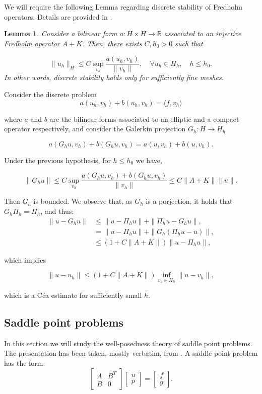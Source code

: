 \documentclass{article}
\newcommand{\R}{\mathbb{R}}
\newtheorem{lemma}{Lemma}
\begin{document}
We will require the following Lemma regarding discrete stability of Fredholm operators. Details are provided in \cite{sayas2019variational}.
\begin{lemma}
Consider a bilinear form $a:H\times H\to \R$ associated to an injective Fredholm operator $A+K$. Then, there exists $C, h_0>0$ such that

\[\|u_h\|_H\leq C\sup_{v_h}\frac{a(u_h,v_h)}{\|v_h\|},\quad \forall u_h\in H_h, \quad h\leq h_0.\]
In other words, discrete stability holds only for sufficiently fine meshes. 
\end{lemma}

Consider the discrete problem
\[a(u_h,v_h) + b(u_h,v_h) = \langle f, v_h\rangle\]

where $a$ and $b$ are the bilinear forms associated to an elliptic and a compact operator respectively, and consider the Galerkin projection $G_h: H\to H_h$

\[a(G_hu, v_h) + b(G_hu, v_h) = a(u, v_h) + b(u,v_h).\]

Under the previous hypothesis, for $h\leq h_0$ we have, 

\[\|G_hu\|\leq C\sup_{v_h}\frac{a(G_hu, v_h) + b(G_hu, v_h)}{\|v_h\|}\leq C\|A+K\|\|u\|.\]

Then $G_h$ is bounded. We observe that, as $G_h$ is a porjection, it holds that $G_h\Pi_h = \Pi_h$, and thus:
\begin{align*}
    \|u - G_hu\|&\leq \|u-\Pi_hu\| + \|\Pi_hu - G_hu\|,\\
    &= \|u-\Pi_hu\| + \|G_h(\Pi_hu - u)\|,\\
    &\leq (1+C\|A+K\|)\|u - \Pi_h u\|,
\end{align*}

which implies

\[\|u-u_h\|\leq (1+C\|A+K\|)\inf_{v_h\in H_h}\|u-v_h\|,\] 

which is a Céa estimate for sufficiently small $h$.

\subsection{Saddle point problems}

In this section we will study the well-posedness theory of saddle point problems. The presentation has been taken, mostly verbatim, from \cite{gatica2014simple}. A saddle point problem has the form:
\begin{displaymath}
    \begin{bmatrix}
        A & B^{T}\\ 
        B & 0
    \end{bmatrix}
    \begin{bmatrix}
        u \\ p
    \end{bmatrix}
    =
    \begin{bmatrix}
        f \\ g
    \end{bmatrix}.
\end{displaymath}
\end{document}
